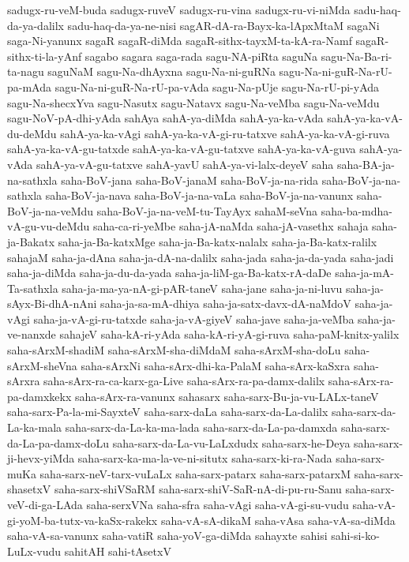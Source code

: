 {sadugx-ru-veM-buda
sadugx-ruveV
sadugx-ru-vina
sadugx-ru-vi-niMda
sadu-haq-da-ya-dalilx
sadu-haq-da-ya-ne-nisi
sagAR-dA-ra-Bayx-ka-lApxMtaM
sagaNi
saga-Ni-yanunx
sagaR
sagaR-diMda
sagaR-sithx-tayxM-ta-kA-ra-Namf
sagaR-sithx-ti-la-yAnf
sagabo
sagara
saga-rada
sagu-NA-piRta
saguNa
sagu-Na-Ba-ri-ta-nagu
saguNaM
sagu-Na-dhAyxna
sagu-Na-ni-guRNa
sagu-Na-ni-guR-Na-rU-pa-mAda
sagu-Na-ni-guR-Na-rU-pa-vAda
sagu-Na-pUje
sagu-Na-rU-pi-yAda
sagu-Na-shecxYva
sagu-Nasutx
sagu-Natavx
sagu-Na-veMba
sagu-Na-veMdu
sagu-NoV-pA-dhi-yAda
sahAya
sahA-ya-diMda
sahA-ya-ka-vAda
sahA-ya-ka-vA-du-deMdu
sahA-ya-ka-vAgi
sahA-ya-ka-vA-gi-ru-tatxve
sahA-ya-ka-vA-gi-ruva
sahA-ya-ka-vA-gu-tatxde
sahA-ya-ka-vA-gu-tatxve
sahA-ya-ka-vA-guva
sahA-ya-vAda
sahA-ya-vA-gu-tatxve
sahA-yavU
sahA-ya-vi-lalx-deyeV
saha
saha-BA-ja-na-sathxla
saha-BoV-jana
saha-BoV-janaM
saha-BoV-ja-na-rida
saha-BoV-ja-na-sathxla
saha-BoV-ja-nava
saha-BoV-ja-na-vaLa
saha-BoV-ja-na-vanunx
saha-BoV-ja-na-veMdu
saha-BoV-ja-na-veM-tu-TayAyx
sahaM-seVna
saha-ba-mdha-vA-gu-vu-deMdu
saha-ca-ri-yeMbe
saha-jA-naMda
saha-jA-vasethx
sahaja
saha-ja-Bakatx
saha-ja-Ba-katxMge
saha-ja-Ba-katx-nalalx
saha-ja-Ba-katx-ralilx
sahajaM
saha-ja-dAna
saha-ja-dA-na-dalilx
saha-jada
saha-ja-da-yada
saha-jadi
saha-ja-diMda
saha-ja-du-da-yada
saha-ja-liM-ga-Ba-katx-rA-daDe
saha-ja-mA-Ta-sathxla
saha-ja-ma-ya-nA-gi-pAR-taneV
saha-jane
saha-ja-ni-luvu
saha-ja-sAyx-Bi-dhA-nAni
saha-ja-sa-mA-dhiya
saha-ja-satx-davx-dA-naMdoV
saha-ja-vAgi
saha-ja-vA-gi-ru-tatxde
saha-ja-vA-giyeV
saha-jave
saha-ja-veMba
saha-ja-ve-nanxde
sahajeV
saha-kA-ri-yAda
saha-kA-ri-yA-gi-ruva
saha-paM-knitx-yalilx
saha-sArxM-shadiM
saha-sArxM-sha-diMdaM
saha-sArxM-sha-doLu
saha-sArxM-sheVna
saha-sArxNi
saha-sArx-dhi-ka-PalaM
saha-sArx-kaSxra
saha-sArxra
saha-sArx-ra-ca-karx-ga-Live
saha-sArx-ra-pa-damx-dalilx
saha-sArx-ra-pa-damxkekx
saha-sArx-ra-vanunx
sahasarx
saha-sarx-Bu-ja-vu-LALx-taneV
saha-sarx-Pa-la-mi-SayxteV
saha-sarx-daLa
saha-sarx-da-La-dalilx
saha-sarx-da-La-ka-mala
saha-sarx-da-La-ka-ma-lada
saha-sarx-da-La-pa-damxda
saha-sarx-da-La-pa-damx-doLu
saha-sarx-da-La-vu-LaLxdudx
saha-sarx-he-Deya
saha-sarx-ji-hevx-yiMda
saha-sarx-ka-ma-la-ve-ni-situtx
saha-sarx-ki-ra-Nada
saha-sarx-muKa
saha-sarx-neV-tarx-vuLaLx
saha-sarx-patarx
saha-sarx-patarxM
saha-sarx-shasetxV
saha-sarx-shiVSaRM
saha-sarx-shiV-SaR-nA-di-pu-ru-Sanu
saha-sarx-veV-di-ga-LAda
saha-serxVNa
saha-sfra
saha-vAgi
saha-vA-gi-su-vudu
saha-vA-gi-yoM-ba-tutx-va-kaSx-rakekx
saha-vA-sA-dikaM
saha-vAsa
saha-vA-sa-diMda
saha-vA-sa-vanunx
saha-vatiR
saha-yoV-ga-diMda
sahayxte
sahisi
sahi-si-ko-LuLx-vudu
sahitAH
sahi-tAsetxV
}
